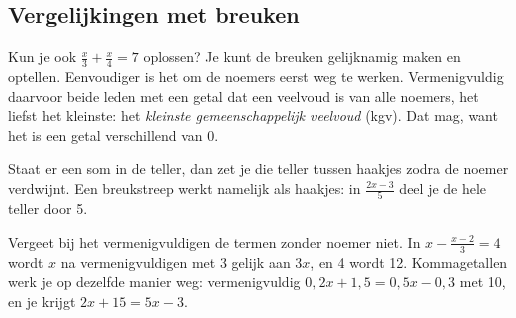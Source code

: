 
\begin{oefeningen}
\end{oefeningen}

\subsection{Vergelijkingen met breuken}

Kun je ook $\tfrac x3 + \tfrac x4 = 7$ oplossen? Je kunt de breuken gelijknamig maken en optellen. Eenvoudiger is het om de noemers eerst weg te werken. Vermenigvuldig daarvoor beide leden met een getal dat een veelvoud is van alle noemers, het liefst het kleinste: het \textit{kleinste gemeenschappelijk veelvoud} (kgv). Dat mag, want het is een getal verschillend van 0.


Staat er een som in de teller, dan zet je die teller tussen haakjes zodra de noemer verdwijnt. Een breukstreep werkt namelijk als haakjes: in $\tfrac{2x - 3}{5}$ deel je de hele teller door 5.


Vergeet bij het vermenigvuldigen de termen zonder noemer niet. In $x - \tfrac{x - 2}{3} = 4$ wordt $x$ na vermenigvuldigen met 3 gelijk aan $3x$, en 4 wordt 12. Kommagetallen werk je op dezelfde manier weg: vermenigvuldig $0{,}2x + 1{,}5 = 0{,}5x - 0{,}3$ met 10, en je krijgt $2x + 15 = 5x - 3$.

